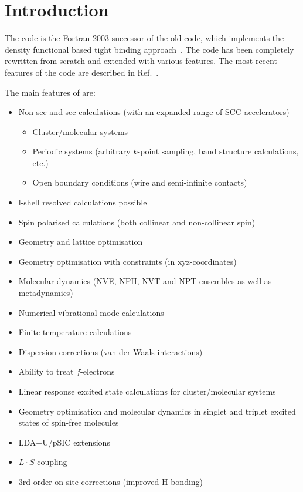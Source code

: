 \chapter{Introduction}

The code {\dftbp} is the Fortran 2003 successor of the old {\dftb}
code, which implements the density functional based tight binding
approach~\cite{frauenheim-JPCM-14-3015}. The code has been completely
rewritten from scratch and extended with various features. The most
recent features of the code are described in
Ref.~\cite{dftbp-2020paper}.

The main features of {\dftbp} are:
\begin{itemize}
\item Non-scc and scc calculations (with an expanded range of SCC
  accelerators)
  \begin{itemize}
  \item Cluster/molecular systems
  \item Periodic systems (arbitrary $k$-point sampling, band structure
    calculations, etc.)
  \item Open boundary conditions (wire and semi-infinite contacts)
  \end{itemize}
\item l-shell resolved calculations possible
\item Spin polarised calculations (both collinear and non-collinear
  spin)
\item Geometry and lattice optimisation
\item Geometry optimisation with constraints (in xyz-coordinates)
\item Molecular dynamics (NVE, NPH, NVT and NPT ensembles as well as
  metadynamics)
\item Numerical vibrational mode calculations
\item Finite temperature calculations
\item Dispersion corrections (van der Waals interactions)
\item Ability to treat $f$-electrons
\item Linear response excited state calculations for cluster/molecular systems
\item Geometry optimisation and molecular dynamics in singlet and triplet
  excited states of spin-free molecules
\item LDA+U/pSIC extensions
\item $L \cdot S$ coupling
\item 3rd order on-site corrections (improved H-bonding)

\end{itemize}
